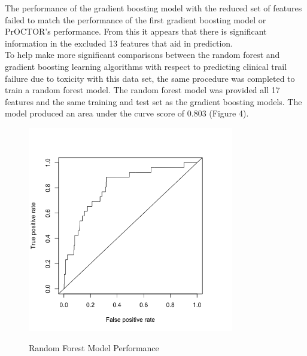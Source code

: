 \documentclass[12pt]{article}
\begin{document}
The performance of the gradient boosting model with the reduced set of features failed to match the performance of the first gradient boosting model or PrOCTOR's performance. From this it appears that there is significant information in the excluded 13 features that aid in prediction.  \\ 
To help make more significant comparisons between the random forest and gradient boosting learning algorithms with respect to predicting clinical trail failure due to toxicity with this data set, the same procedure was completed to train a random forest model. The random forest model was provided all 17 features and the same training and test set as the gradient boosting models. The model produced an area under the curve score of 0.803 (Figure 4).

\begin{figure}[h!]
\centering
\includegraphics[width=9cm]{RFAUC.png}
  \label{fig:sub1}
  \caption{Random Forest Model Performance}
\end{figure}

\newpage
\end{document}
